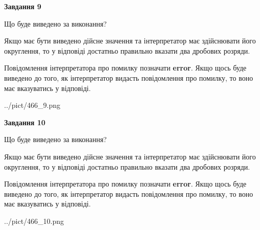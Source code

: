 \documentclass[12pt, ukrainian]{article}
\begin{document}
{\begin {Large}
{\begin {center}\textbf{Завдання 9}\end {center}}\par
Що буде виведено за виконання? \par

Якщо має бути виведено дійсне значення та інтерпретатор має здійснювати його округлення, 
то у відповіді достатньо правильно вказати два дробових розряди.

Повідомлення інтерпретатора про помилку позначати \textbf{error}.
Якщо щось буде виведено до того, як інтерпретатор видасть повідомлення про помилку, 
то воно має вказуватись у відповіді. \par

\begin{center}
	{../pict/466_9.png}
\end{center}
\newpage

{\begin {center}\textbf{Завдання 10}\end {center}}\par
Що буде виведено за виконання? \par

Якщо має бути виведено дійсне значення та інтерпретатор має здійснювати його округлення, 
то у відповіді достатньо правильно вказати два дробових розряди.

Повідомлення інтерпретатора про помилку позначати \textbf{error}.
Якщо щось буде виведено до того, як інтерпретатор видасть повідомлення про помилку, 
то воно має вказуватись у відповіді. \par

\begin{center}
	{../pict/466_10.png}
\end{center}
\newpage

\end {Large}}
\end{document}
